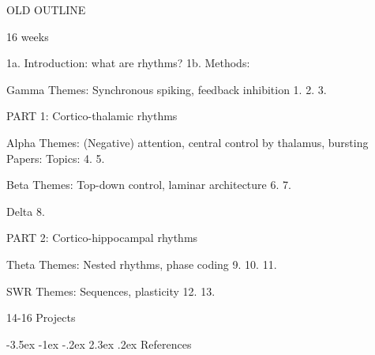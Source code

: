 \documentclass[11pt, reqno]{amsart}
\makeatletter
\numberwithin{figure}{section}
\renewcommand\section{\@startsection {section}{1}{\z@}%
                                   {-3.5ex \@plus -1ex \@minus -.2ex}%
                                   {2.3ex \@plus.2ex}%
                                   {\normalfont\Large\bfseries\scshape}}
\numberwithin{equation}{section}
\makeatother
\begin{document}
OLD OUTLINE


16 weeks

1a. Introduction: what are rhythms?
1b. Methods:

Gamma
Themes: Synchronous spiking, feedback inhibition
1.  
2.
3.

PART 1: Cortico-thalamic rhythms

Alpha
Themes: (Negative) attention, central control by thalamus, bursting
Papers:
Topics:
4. 
5.

Beta
Themes: Top-down control, laminar architecture
6.
7.

Delta
8.

PART 2: Cortico-hippocampal rhythms

Theta
Themes: Nested rhythms, phase coding
9.
10.
11.

SWR
Themes: Sequences, plasticity
12.
13.


14-16 Projects


\section{References}
\end{document}
